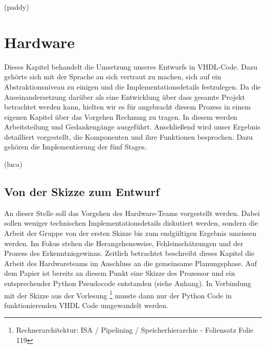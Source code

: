\documentclass[paper=a4,fontsize=12pt,twocolumn]{scrreprt}
\begin{document}
(paddy)

\chapter{Hardware}

Dieses Kapitel behandelt die Umsetzung unseres Entwurfs in VHDL-Code.
Dazu gehörte sich mit der Sprache an sich vertraut zu machen, sich auf ein Abstraktionsniveau zu einigen und die Implementationsdetails festzulegen.
Da die Auseinandersetzung darüber als eine Entwicklung über dass gesamte Projekt betrachtet werden kann, hielten wir es für angebracht diesem Prozess in einem eigenen Kapitel über das Vorgehen Rechnung zu tragen.
In diesem werden Arbeitsteilung und Gedankengänge ausgeführt. %
Anschließend wird unser Ergebnis detailliert vorgestellt, die Komponenten und ihre Funktionen besprochen. Dazu gehören die Implementierung der fünf Stages. %






(luca)

\section{Von der Skizze zum Entwurf}

An dieser Stelle soll das Vorgehen des Hardware-Teams vorgestellt werden.
Dabei sollen weniger technischen Implementationsdetails diskutiert werden, sondern die Arbeit der Gruppe von der ersten Skizze bis zum endgültigen Ergebnis umrissen werden.
Im Fokus stehen die Herangehensweise, Fehleinschätzungen und der Prozess des Erkenntnisgewinns.
Zeitlich betrachtet beschreibt dieses Kapitel die Arbeit des Hardwareteams im Anschluss an die gemeinsame Planungsphase.
Auf dem Papier ist bereits an diesem Punkt eine Skizze des Prozessor und ein entsprechender Python Pseudocode entstanden (siehe Anhang).
In Verbindung mit der Skizze aus der Vorlesung \footnote{Rechnerarchitektur: ISA / Pipelining / Speicherhierarchie - Foliensatz Folie 119} musste dann nur der Python Code in funktionierenden VHDL Code umgewandelt werden.
\end{document}
